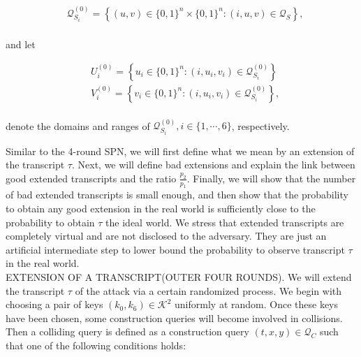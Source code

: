 $$
\begin{aligned}
&\mathcal{Q}_{S_{i}}^{(0)}=\left\{(u, v) \in\{0,1\}^{n} \times\{0,1\}^{n}:(i, u, v) \in \mathcal{Q}_{S} \right\},\\
\end{aligned}
$$

\noindent and let

$$
\begin{aligned}
&U_{i}^{(0)}=\left\{u_{i} \in\{0,1\}^{n}:\left(i, u_{i}, v_{i}\right) \in \mathcal{Q}_{S_{i}}^{(0)}\right\}\\
&V_{i}^{(0)}=\left\{v_{i} \in\{0,1\}^{n}:\left(i, u_{i}, v_{i}\right) \in \mathcal{Q}_{S_{i}}^{(0)}\right\},\\
\end{aligned}
$$

\noindent denote the domains and ranges of $\mathcal{Q}_{S_{i}}^{(0)}, i \in \{1, \cdots, 6\}$, respectively.

Similar to the 4-round SPN, we will first define what we mean by an extension of the transcript $\tau$. Next, we will define bad extensions and explain the link between good extended transcripts and the ratio $\frac{p_2}{p_1}$. Finally, we will show that the number of bad extended transcripts is small enough, and then show that the probability to obtain any good extension in the real world is sufficiently close to the probability to obtain $\tau$ the ideal world. We stress that extended transcripts are completely virtual and are not disclosed to the adversary. They are just an artificial intermediate step to lower bound the probability to observe transcript $\tau$ in the real world.\\

\noindent
\textsc{EXTENSION OF A TRANSCRIPT(OUTER FOUR ROUNDS)}. We will extend the transcript $\tau$ of the attack via a certain randomized process. We begin with choosing a pair of keys $\left(k_{0}, k_{6}\right) \in \mathcal{K}^{2}$ uniformly at random. Once these keys have been chosen, some construction queries will become involved in collisions. Then a colliding query is defined as a construction query $(t, x, y) \in \mathcal{Q}_{C}$ such that one of the following conditions holds:

